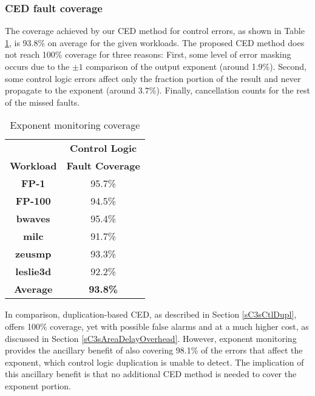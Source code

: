 \documentclass[12pt]{yalephd}
\begin{document}
\subsubsection{CED fault coverage}

The coverage achieved by our CED method for control errors, as shown in Table \ref{sC3tCEDcoverage}, is 93.8\% on average for the given workloads. The proposed CED method does not reach 100\% coverage for three reasons: First, some level of error masking occurs due to the $\pm 1$ comparison of the output exponent (around 1.9\%). Second, some control logic errors affect only the fraction portion of the result and never propagate to the exponent (around 3.7\%). Finally, cancellation counts for the rest of the missed faults.

\begin{table}[!ht]
\caption{Exponent monitoring coverage}\label{sC3tCEDcoverage}
\begin{center}
\begin{tabular}{||c|c||}
\hline
\hline
& {\bf Control Logic} \\
{\bf Workload} & {\bf Fault Coverage}  \\
\hline
\hline
{\bf FP-1} & 95.7\% \\
\hline
{\bf FP-100} & 94.5\%  \\
\hline
{\bf bwaves} & 95.4\%  \\
\hline
{\bf milc} & 91.7\%  \\
\hline
{\bf zeusmp} & 93.3\%  \\
\hline
{\bf leslie3d} & 92.2\%  \\
\hline
\hline
{\bf Average} & {\bf 93.8\%}  \\
\hline
\hline
\end{tabular}
\end{center}
\end{table}

In comparison, duplication-based CED, as described in Section \ref{sC3sCtlDupl}, offers 100\% coverage, yet with possible false alarms and at a much higher cost, as discussed in Section \ref{sC3sAreaDelayOverhead}. However, exponent monitoring provides the ancillary benefit of also covering 98.1\% of the errors that affect the exponent, which control logic duplication is unable to detect. The implication of this ancillary benefit is that no additional CED method is needed to cover the exponent portion.
\end{document}

